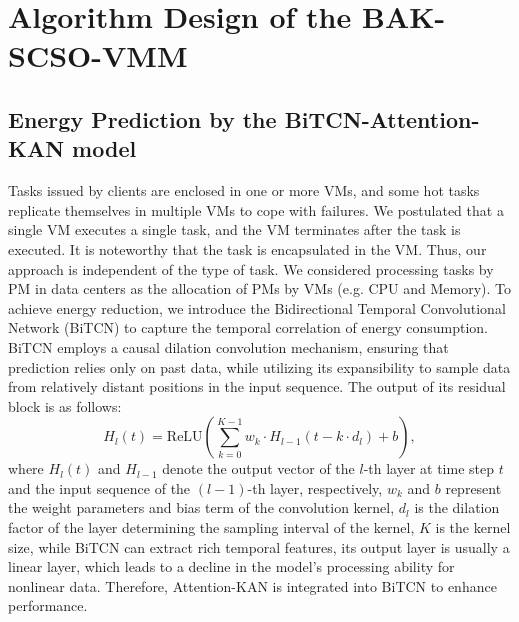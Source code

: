 \documentclass[conference]{{IEEEtran}}
\begin{document}
\section{Algorithm Design of the BAK-SCSO-VMM}

\subsection{Energy Prediction by the BiTCN-Attention-KAN model}

Tasks issued by clients are enclosed in one or more VMs, and some hot tasks replicate themselves in multiple VMs to cope with failures. We postulated that a single VM executes a single task, and the VM terminates after the task is executed. It is noteworthy that the task is encapsulated in the VM. Thus, our approach is independent of the type of task. We considered processing tasks by PM in data centers as the allocation of PMs by VMs (e.g. CPU and Memory). To achieve energy reduction, we introduce the Bidirectional Temporal Convolutional Network (BiTCN) to capture the temporal correlation of energy consumption. BiTCN employs a causal dilation convolution mechanism, ensuring that prediction relies only on past data, while utilizing its expansibility to sample data from relatively distant positions in the input sequence. The output of its residual block is as follows:
\begin{equation}
    H_l(t) = \text{ReLU}\left( \sum_{k=0}^{K-1} w_k \cdot H_{l-1}(t - k \cdot d_l) + b \right),
    \label{eq:dilated_conv}
\end{equation}
where $H_l(t)$ and $H_{l-1}$ denote the output vector of the $l$-th layer at time step $t$ and the input sequence of the $(l-1)$-th layer, respectively,  $w_k$ and $b$ represent the weight parameters and bias term of the convolution kernel,  $d_l$ is the dilation factor of the layer determining the sampling interval of the kernel,  $K$ is the kernel size, while BiTCN can extract rich temporal features, its output layer is usually a linear layer, which leads to a decline in the model's processing ability for nonlinear data\cite{zhang2025predicting}. Therefore, Attention-KAN is integrated into BiTCN to enhance performance.
\end{document}
